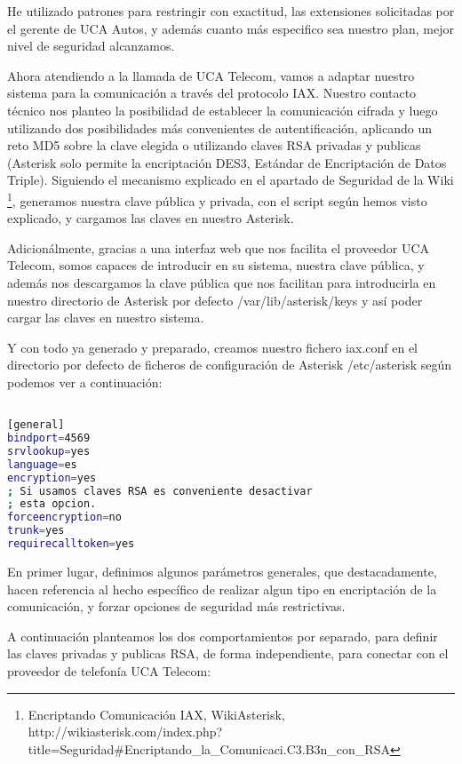 He utilizado patrones para restringir con exactitud, las extensiones solicitadas por el gerente de UCA Autos, y además cuanto más especifico sea nuestro plan, mejor nivel de seguridad alcanzamos.

Ahora atendiendo a la llamada de UCA Telecom, vamos a adaptar nuestro sistema para la comunicación a través del protocolo IAX. Nuestro contacto técnico nos planteo la posibilidad de establecer la comunicación cifrada y luego utilizando dos posibilidades más convenientes de autentificación, aplicando un reto MD5 sobre la clave elegida o utilizando claves RSA privadas y publicas (Asterisk solo permite la encriptación DES3, Estándar de Encriptación de Datos Triple). Siguiendo el mecanismo explicado en el apartado de Seguridad de la Wiki \footnote{Encriptando Comunicación IAX, WikiAsterisk, \\http://wikiasterisk.com/index.php?title=Seguridad\#Encriptando\_la\_Comunicaci.C3.B3n\_con\_RSA}, generamos nuestra clave pública y privada, con el script según hemos visto explicado, y cargamos las claves en nuestro Asterisk.

Adicionálmente, gracias a una interfaz web que nos facilita el proveedor UCA Telecom, somos capaces de introducir en su sistema, nuestra clave pública, y además nos descargamos la clave pública que nos facilitan para introducirla en nuestro directorio de Asterisk por defecto /var/lib/asterisk/keys y así poder cargar las claves en nuestro sistema.

Y con todo ya generado y preparado, creamos nuestro fichero iax.conf en el directorio por defecto de ficheros de configuración de Asterisk /etc/asterisk según podemos ver a continuación:

\begin{lstlisting}[language=bash,title={/etc/asterisk/iax.conf}]

[general]
bindport=4569
srvlookup=yes
language=es
encryption=yes
; Si usamos claves RSA es conveniente desactivar 
; esta opcion.
forceencryption=no
trunk=yes
requirecalltoken=yes

\end{lstlisting}

En primer lugar, definimos algunos parámetros generales, que destacadamente, hacen referencia al hecho específico de realizar algun tipo en encriptación de la comunicación, y forzar opciones de seguridad más restrictivas.

A continuación planteamos los dos comportamientos por separado, para definir las claves privadas y publicas RSA, de forma independiente, para conectar con el proveedor de telefonía UCA Telecom:

